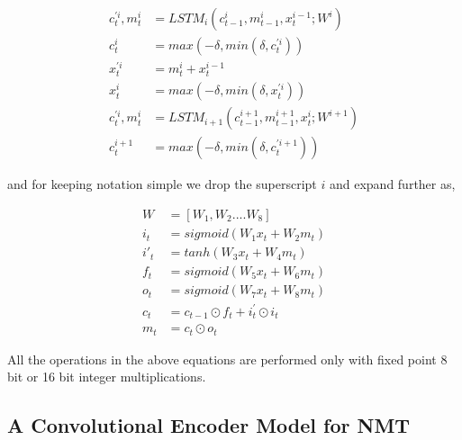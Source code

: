 \documentclass[a4paper]{article}
\begin{document}
\begin{equation}
  \begin{split}
    c^{'i}_t,m^i_t & = LSTM_i(c^{i}_{t-1},m^i_{t-1}, x^{i-1}_t; W^i ) \\
    c^{i}_t & = max(-\delta, min (\delta,c^{'i}_t )) \\
    x^{'i}_t & = m^{i}_t + x^{i-1}_t \\
    x^{i}_t & =  max(-\delta, min (\delta,x^{'i}_t )) \\
    c^{'i}_t,m^i_t & = LSTM_{i+1}(c^{i+1}_{t-1},
                       m^{i+1}_{t-1}, x^{i}_t; W^{i+1} ) \\
    c^{i+1}_t & =  max(-\delta, min (\delta,c^{'i+1}_t ))
  \end{split}
\end{equation}


and for keeping notation simple we drop the superscript $i$  and expand  further
as,


\begin{equation}
  \begin{split}
    W & = [W_1,W_2....W_8] \\
    i_t & =  sigmoid(W_1x_t + W_2m_t) \\
    {i'}_t & = tanh(W_3x_t + W_4m_t) \\
    f_t & =  sigmoid(W_5x_t + W_6m_t) \\
    o_t & = sigmoid(W_7x_t + W_8m_t) \\
    c_t & =  c_{t-1} \odot f_t + i^{'}_t \odot i_t \\
    m_t & = c_t \odot o_t
  \end{split}
\end{equation}


All the operations in the above equations are performed only with fixed point  8
bit or 16 bit integer multiplications.


\subsection{A Convolutional Encoder Model for NMT}
\end{document}
